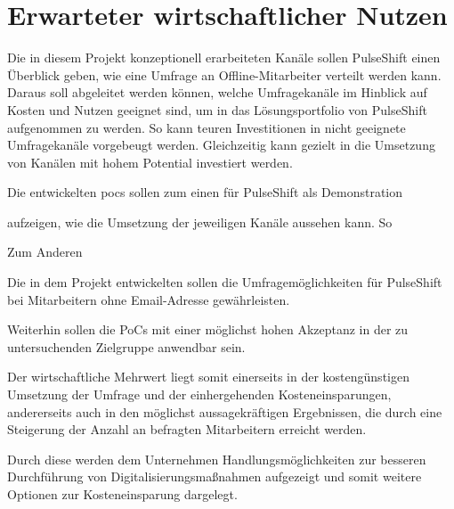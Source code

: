 \section{Erwarteter wirtschaftlicher Nutzen}

Die in diesem Projekt konzeptionell erarbeiteten Kanäle sollen PulseShift einen Überblick geben, wie eine Umfrage an Offline-Mitarbeiter verteilt werden kann. Daraus soll abgeleitet werden können, welche Umfragekanäle im Hinblick auf Kosten und Nutzen geeignet sind, um in das Lösungsportfolio von PulseShift aufgenommen zu werden. So kann teuren Investitionen in nicht geeignete Umfragekanäle vorgebeugt werden. Gleichzeitig kann gezielt in die Umsetzung von Kanälen mit hohem Potential investiert werden. 

Die entwickelten \gls{poc}s sollen zum einen für PulseShift als Demonstration


 aufzeigen, wie die Umsetzung der jeweiligen Kanäle aussehen kann. So 

 Zum Anderen



Die in dem Projekt entwickelten  sollen die Umfragemöglichkeiten für PulseShift bei Mitarbeitern ohne Email-Adresse gewährleisten.

 
 Weiterhin sollen die PoCs mit einer möglichst hohen Akzeptanz in der zu untersuchenden Zielgruppe anwendbar sein. 
 
 Der wirtschaftliche Mehrwert liegt somit einerseits in der kostengünstigen Umsetzung der Umfrage und der einhergehenden Kosteneinsparungen, andererseits auch in den möglichst aussagekräftigen Ergebnissen, die durch eine Steigerung der Anzahl an befragten Mitarbeitern erreicht werden. 
 
 Durch diese werden dem Unternehmen Handlungsmöglichkeiten zur besseren Durchführung von Digitalisierungsmaßnahmen aufgezeigt und somit weitere Optionen zur Kosteneinsparung dargelegt.
